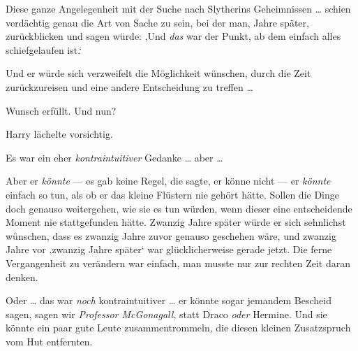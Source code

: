 Diese ganze Angelegenheit mit der Suche nach Slytherins Geheimnissen … schien verdächtig genau die Art von Sache zu sein, bei der man, Jahre später, zurückblicken und sagen würde: ‚Und \emph{das} war der Punkt, ab dem einfach alles schiefgelaufen ist.‘

Und er würde sich verzweifelt die Möglichkeit wünschen, durch die Zeit zurückzureisen und eine andere Entscheidung zu treffen …

Wunsch erfüllt. Und nun?

Harry lächelte vorsichtig.

Es war ein eher \emph{kontraintuitiver} Gedanke … aber …

Aber er \emph{könnte} — es gab keine Regel, die sagte, er könne nicht — er \emph{könnte} einfach so tun, als ob er das kleine Flüstern nie gehört hätte. Sollen die Dinge doch genauso weitergehen, wie sie es tun würden, wenn dieser eine entscheidende Moment nie stattgefunden hätte. Zwanzig Jahre später würde er sich sehnlichst wünschen, dass es zwanzig Jahre zuvor genauso geschehen wäre, und zwanzig Jahre vor ‚zwanzig Jahre später‘ war glücklicherweise gerade jetzt. Die ferne Vergangenheit zu verändern war einfach, man musste nur zur rechten Zeit daran denken.

Oder … das war \emph{noch} kontraintuitiver … er könnte sogar jemandem Bescheid sagen, sagen wir \emph{Professor McGonagall}, statt Draco \emph{oder} Hermine. Und sie könnte ein paar gute Leute zusammentrommeln, die diesen kleinen Zusatzspruch vom Hut entfernten.

